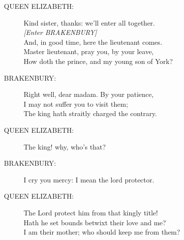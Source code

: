 \documentclass{article}
\begin{document}
\begin{description}
\item[QUEEN ELIZABETH:] 
\hspace{1pt}Kind sister, thanks: we'll enter all together.\\
{\it [Enter BRAKENBURY]}\\
\hspace{1pt}And, in good time, here the lieutenant comes.\\
\hspace{1pt}Master lieutenant, pray you, by your leave,\\
\hspace{1pt}How doth the prince, and my young son of York?\\
\end{description}
\begin{description}
\item[BRAKENBURY:] 
\hspace{1pt}Right well, dear madam. By your patience,\\
\hspace{1pt}I may not suffer you to visit them;\\
\hspace{1pt}The king hath straitly charged the contrary.\\
\end{description}
\begin{description}
\item[QUEEN ELIZABETH:] 
\hspace{1pt}The king! why, who's that?\\
\end{description}
\begin{description}
\item[BRAKENBURY:] 
\hspace{1pt}I cry you mercy: I mean the lord protector.\\
\end{description}
\begin{description}
\item[QUEEN ELIZABETH:] 
\hspace{1pt}The Lord protect him from that kingly title!\\
\hspace{1pt}Hath he set bounds betwixt their love and me?\\
\hspace{1pt}I am their mother; who should keep me from them?\\
\end{description}
\end{document}
